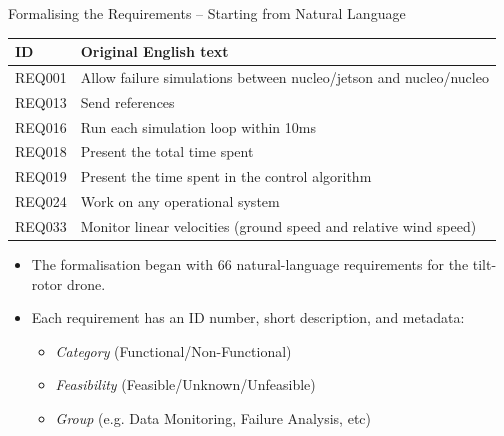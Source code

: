 \documentclass[11pt, aspectratio=169, table]{beamer}
\begin{document}
\begin{frame}{Formalising the Requirements -- Starting from Natural Language}
\begin{table}
    \centering
    \begin{tabular}{|p{}|p{}|}
    \hline
         \textbf{ID} & \textbf{Original English text} \\\hline
         \hline
         REQ001 & Allow failure simulations between nucleo/jetson and nucleo/nucleo \\\hline
         REQ013 & Send references \\\hline %
		 REQ016 & Run each simulation loop within 10ms \\\hline        
         REQ018 & Present the total time spent \\\hline
         REQ019 & Present the time spent in the control algorithm \\\hline
         REQ024 & Work on any operational system \\\hline %
         REQ033 & Monitor linear velocities (ground speed and relative wind speed) \\\hline
         
    \end{tabular}
\end{table}

\begin{block}{}
\begin{itemize}
	\item The formalisation began with 66 natural-language requirements for the tilt-rotor drone.
	
	\item Each requirement has an ID number, short description, and metadata:
	\begin{itemize}
	\item \textit{Category} (Functional/Non-Functional)
	\item \textit{Feasibility} (Feasible/Unknown/Unfeasible)
	\item \textit{Group} (e.g. Data Monitoring, Failure Analysis, etc)
	\end{itemize}
\end{itemize}
\end{block}

\end{frame}
\end{document}
